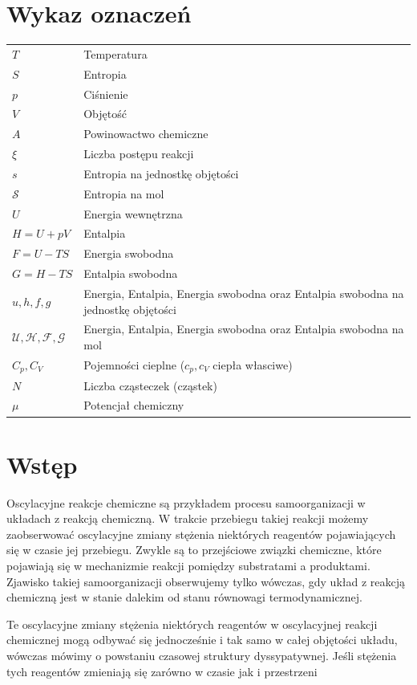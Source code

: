 \documentclass[10pt, a4paper, twoside, onecolumn]{article}
\numberwithin{equation}{section}
\begin{document}
	\section*{Wykaz oznaczeń}
	\setlength{\parindent}{0cm}
	\begin{table}[H]
	\begin{tabular}{@{} ll}
		\(T\) & Temperatura \\
		\(S\) & Entropia \\
		\(p\) & Ciśnienie \\
		\(V\) & Objętość \\
		\(A\) & Powinowactwo chemiczne \\
		\(\xi\) & Liczba postępu reakcji \\
		\(s\) & Entropia na jednostkę objętości \\
		\(\mathscr{S}\) & Entropia na mol \\
		\(U\) & Energia wewnętrzna \\
		\(H=U+pV\) & Entalpia \\
		\(F=U-TS\) & Energia swobodna \\
		\(G=H-TS\) & Entalpia swobodna \\
		\(u, h, f, g\) & Energia, Entalpia, Energia swobodna oraz Entalpia swobodna na jednostkę objętości \\
		\(\mathscr{U, H, F, G}\) & Energia, Entalpia, Energia swobodna oraz Entalpia swobodna na mol \\
		\(C_{p}, C_{V}\) & Pojemności cieplne (\(c_{p}, c_{V}\) ciepła własciwe) \\
		\(N\) & Liczba cząsteczek (cząstek) \\
		\(\mu\) & Potencjał chemiczny
	\end{tabular}
	\end{table}
	\setlength{\parindent}{1.25cm}
	\pagebreak
	
	\section{Wstęp}
	
	Oscylacyjne reakcje chemiczne są przykładem procesu samoorganizacji w układach z reakcją chemiczną. W trakcie przebiegu takiej reakcji możemy zaobserwować oscylacyjne zmiany stężenia niektórych reagentów pojawiających się w czasie jej przebiegu. Zwykle są to przejściowe związki chemiczne, które pojawiają się w mechanizmie reakcji pomiędzy substratami a produktami. Zjawisko takiej samoorganizacji obserwujemy tylko wówczas, gdy układ z reakcją chemiczną jest w stanie dalekim od stanu równowagi termodynamicznej. \par
	Te oscylacyjne zmiany stężenia niektórych reagentów w oscylacyjnej reakcji chemicznej mogą odbywać się jednocześnie i tak samo w całej objętości układu, wówczas mówimy o powstaniu czasowej struktury dyssypatywnej. Jeśli stężenia tych reagentów zmieniają się zarówno w czasie jak i przestrzeni
	
\end{document}
